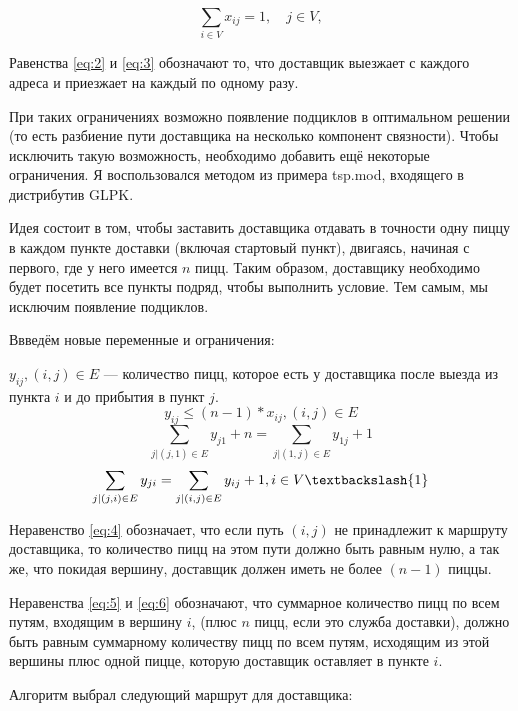 \documentclass[]{article}
\begin{document}
\begin{equation}\label{eq:3}
	\sum_{i\in V}
			x_{ij} = 1,\quad j\in V,
\end{equation}

Равенства \eqref{eq:2} и \eqref{eq:3} обозначают то, что
доставщик выезжает с каждого адреса и приезжает на каждый по одному разу.

При таких ограничениях возможно появление подциклов в оптимальном решении
(то есть разбиение пути доставщика на несколько компонент связности).
Чтобы исключить такую возможность, необходимо добавить ещё некоторые ограничения.
Я воспользовался методом из примера tsp.mod, входящего в дистрибутив GLPK.

Идея состоит в том, чтобы заставить доставщика отдавать в точности одну
пиццу в каждом пункте доставки (включая стартовый пункт), двигаясь, начиная
с первого, где у него имеется $n$ пицц. Таким образом, доставщику необходимо
будет посетить все пункты подряд, чтобы выполнить условие.
Тем самым, мы исключим появление подциклов.

Ввведём новые переменные и ограничения:

$y_{ij}, (i,j)\in E $ --- количество пицц, которое есть у доставщика
после выезда из пункта $i$ и до прибытия в пункт $j$.
\begin{equation} \label{eq:4}
	y_{ij} \leq (n-1) * x_{ij}, (i,j) \in E
\end{equation}
\begin{equation} \label{eq:5}
	\sum_{j| (j,1) \in E} y_{j1} + n = \sum_{j| (1, j) \in E} y_{1j} + 1
\end{equation}
\begin{equation}\label{eq:6}
	\sum_{j| (j,i) \in E} y_{ji} = \sum_{j| (i, j) \in E} y_{ij} + 1, i \in V \textbackslash\{1\}
\end{equation}

Неравенство \eqref{eq:4} обозначает, что если путь $(i,j)$ не принадлежит к
маршруту доставщика, то количество пицц на этом пути должно быть равным нулю, а
так же, что покидая вершину, доставщик должен иметь не более $(n - 1)$ пиццы.

Неравенства \eqref{eq:5} и \eqref{eq:6} обозначают, что суммарное
количество пицц по всем путям, входящим в вершину $i$, (плюс $n$ пицц,
если это служба доставки), должно быть равным суммарному количеству
пицц по всем путям, исходящим из этой вершины плюс одной пицце, которую
доставщик оставляет в пункте $i$.

Алгоритм выбрал следующий маршрут для доставщика:
\end{document}
